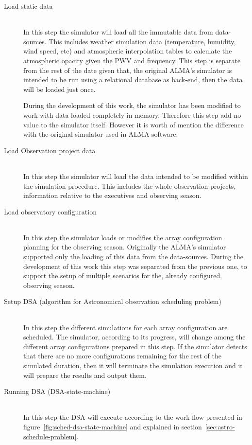 \begin{description}
\item[Load static data] \hfill \\
In this step the simulator will load all the immutable data from data-sources. This includes weather simulation data (temperature, humidity, wind speed, etc) and atmospheric interpolation tables to calculate the atmospheric opacity given the PWV and frequency. This step is separate from the rest of the date given that, the original ALMA's simulator is intended to be run using a relational database as back-end, then the data will be loaded just once.

During the development of this work, the simulator has been modified to work with data loaded completely in memory. Therefore this step add no value to the simulator itself. However it is worth of mention the difference with the original simulator used in ALMA software. 

\item[Load Observation project data] \hfill \\
In this step the simulator will load the data intended to be modified within the simulation procedure. This includes the whole observation projects, information relative to the executives and observing season.

\item[Load observatory configuration] \hfill \\
In this step the simulator loads or modifies the array configuration planning for the observing season. Originally the ALMA's simulator supported only the loading of this data from the data-sources. During the development of this work this step was separated from the previous one, to support the setup of multiple scenarios for the, already configured, observing season.

\item[Setup DSA (algorithm for Astronomical observation scheduling problem)] \hfill \\
In this step the different simulations for each array configuration are scheduled. The simulator, according to its progress, will change among the different array configurations prepared in this step. If the simulator detects that there are no more configurations remaining for the rest of the simulated duration, then it will terminate the simulation execution and it will prepare the results and output them.

\item[Running DSA (DSA-state-machine)] \hfill \\
In this step the DSA will execute according to the work-flow presented in figure~\ref{fig:sched-dsa-state-machine} and explained in section~\ref{sec:astro-schedule-problem}.


\end{description}
